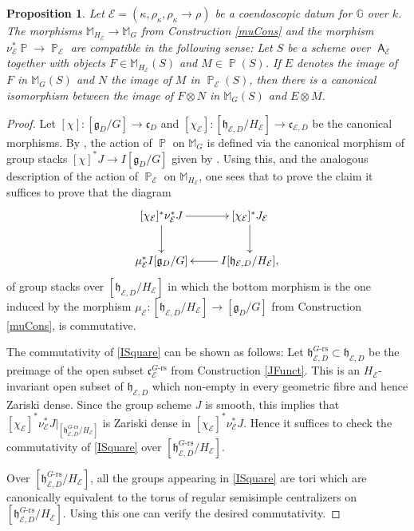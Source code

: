 \documentclass{article}
\DeclareMathOperator{\A}{\mathsf{A}}
\DeclareMathOperator{\Pb}{\mathbb{P}}
\newcommand{\BG}{{\mathbb{G}}}
\newcommand{\BM}{{\mathbb{M}}}
\newcommand{\CE}{{\mathcal E}}
\theoremstyle{definition}
\theoremstyle{plain}
\newtheorem{proposition}[definition]{Proposition}
\begin{document}
\begin{proposition} \label{PFuncComp}
  Let $\CE=(\kappa,\rho_\kappa,\rho_\kappa \to \rho)$ be a coendoscopic datum for $\BG$ over $k$. The morphisms $\BM_{H_\CE} \to \BM_G$ from Construction \ref{muCons} and the morphism $\nu_\CE^* \Pb \to \Pb_\CE$ are compatible in the following sense: Let $S$ be a scheme over $\A_\CE$ together with objects $F \in \BM_{H_\CE}(S)$ and $M \in \Pb(S)$. If $E$ denotes the image of $F$ in $\BM_G(S)$ and $N$ the image of $M$ in $\Pb_\CE(S)$, then there is a canonical isomorphism between the image of $F \otimes N$ in $\BM_G(S)$ and $E \otimes M$. 
\end{proposition}
\begin{proof}
  Let $[\chi]\colon [\mathfrak{g}_D/G] \to \mathfrak{c}_D$ and $[\chi_\CE]\colon [\mathfrak{h}_{\CE,D}/H_\CE] \to\mathfrak{c}_{\CE,D}$ be the canonical morphisms. By \cite[4.3.2]{MR2653248}, the action of $\Pb$ on $\BM_G$ is defined via the canonical morphism of group stacks $[\chi]^*J \to I[\mathfrak{g}_D/G]$ given by \cite[Lemma 2.2.1]{MR2653248}. Using this, and the analogous description of the action of $\Pb_\CE$ on $\BM_{H_\CE}$, one sees that to prove the claim it suffices to prove that the diagram
  \begin{equation} \label{ISquare}
    \xymatrix{
      [\chi_\CE]^* \nu_\CE^* J \ar[r] \ar[d] & [\chi_\CE]^* J_\CE \ar[d] \\
      \mu_\CE^* I[\mathfrak{g}_D/G]  & I [\mathfrak{h}_{\CE,D}/H_\CE], \ar[l] \\
}
  \end{equation}
of group stacks over $[\mathfrak{h}_{\CE,D}/H_\CE]$ in which the bottom morphism is the one induced by the morphism $\mu_\CE\colon [\mathfrak{h}_{\CE,D}/H_\CE] \to [\mathfrak{g}_D/G]$ from Construction \ref{muCons}, is commutative.

The commutativity of \eqref{ISquare} can be shown as follows: Let $\mathfrak{h}_{\CE,D}^\text{$G$-rs} \subset \mathfrak{h}_{\CE,D}$ be the preimage of the open subset $\mathfrak{c}_{\CE}^\text{$G$-rs}$ from Construction \ref{JFunct}. This is an $H_\CE$-invariant open subset of $\mathfrak{h}_{\CE,D}$ which non-empty in every geometric fibre and hence Zariski dense. Since the group scheme $J$ is smooth, this implies that $[\chi_\CE]^* \nu_\CE^* J|_{[\mathfrak{h}_{\CE,D}^\text{$G$-rs}/H_\CE]}$ is Zariski dense in $[\chi_\CE]^* \nu_\CE^* J$. Hence it suffices to check the commutativity of \eqref{ISquare} over $[\mathfrak{h}_{\CE,D}^\text{$G$-rs}/H_\CE]$.

Over $[\mathfrak{h}_{\CE,D}^\text{$G$-rs}/H_\CE]$, all the groups appearing in \eqref{ISquare} are tori which are canonically equivalent to the torus of regular semisimple centralizers on $[\mathfrak{h}_{\CE,D}^\text{$G$-rs}/H_\CE]$. Using this one can verify the desired commutativity.
\end{proof}
\end{document}
